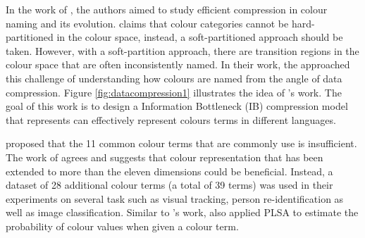 In the work of \cite{zaslavsky2018efficient}, the authors aimed to study efficient compression in colour naming and its evolution.  claims that colour categories cannot be hard-partitioned in the colour space, instead, a soft-partitioned approach should be taken. However, with a soft-partition approach, there are transition regions in the colour space that are often inconsistently named. 
In their work, the approached this challenge of understanding how colours are named from the angle of data compression. Figure \ref{fig:datacompression1} illustrates the idea of 's work. The goal of this work is to design a Information Bottleneck (IB) compression model that represents can effectively represent colours terms in different languages. 

 proposed that the 11 common colour terms that are commonly use is insufficient. The work of  agrees and suggests that colour representation that has been extended to more than the eleven dimensions could be beneficial. Instead, a dataset of 28 additional colour terms (a total of 39 terms) was used in their experiments on several task such as visual tracking, person re-identification as well as image classification. Similar to 's work,  also applied PLSA to estimate the probability of colour values when given a colour term.


